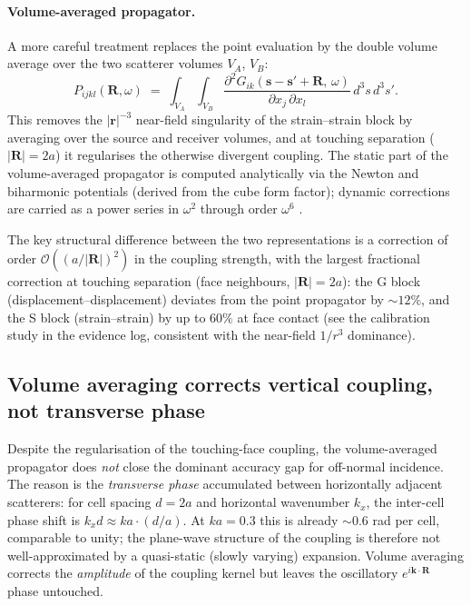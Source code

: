 \documentclass[11pt,a4paper]{article}
\theoremstyle{plain}
\theoremstyle{definition}
\theoremstyle{remark}
\begin{document}
\paragraph{Volume-averaged propagator.}
A more careful treatment replaces the point evaluation by the double
volume average over the two scatterer volumes $V_A$, $V_B$:
\begin{equation}
  P_{ijkl}(\mathbf{R},\omega)
  \;=\;
  \int_{V_A}\!\int_{V_B}
  \frac{\partial^2 G_{ik}(\mathbf{s} - \mathbf{s}' + \mathbf{R},\,\omega)}%
       {\partial x_j\,\partial x_l}
  \,d^3s\,d^3s'.
  \label{eq:va-prop}
\end{equation}
This removes the $|\mathbf{r}|^{-3}$ near-field singularity of the
strain--strain block by averaging over the source and receiver volumes,
and at touching separation ($|\mathbf{R}| = 2a$) it regularises the
otherwise divergent coupling.  The static part of the volume-averaged
propagator is computed analytically via the Newton and biharmonic
potentials (derived from the cube form factor); dynamic corrections
are carried as a power series in $\omega^2$ through order $\omega^6$
\cite{mura1987}.

The key structural difference between the two representations is a
correction of order $\mathcal{O}((a/|\mathbf{R}|)^2)$ in the coupling
strength, with the largest fractional correction at touching separation
(face neighbours, $|\mathbf{R}| = 2a$): the G block (displacement--displacement)
deviates from the point propagator by $\sim\!12\%$, and the S block
(strain--strain) by up to $60\%$ at face contact (see the calibration
study in the evidence log, consistent with the near-field $1/r^3$ dominance).

\subsection{Volume averaging corrects vertical coupling, not transverse phase}
\label{sec:inter-vertical-vs-transverse}

Despite the regularisation of the touching-face coupling, the volume-averaged
propagator does \emph{not} close the dominant accuracy gap for off-normal
incidence.  The reason is the \emph{transverse phase} accumulated between
horizontally adjacent scatterers: for cell spacing $d = 2a$ and horizontal
wavenumber $k_x$, the inter-cell phase shift is $k_x d \approx ka \cdot
(d/a)$.  At $ka = 0.3$ this is already $\sim\!0.6$ rad per cell, comparable
to unity; the plane-wave structure of the coupling is therefore not
well-approximated by a quasi-static (slowly varying) expansion.  Volume
averaging corrects the \emph{amplitude} of the coupling kernel but leaves
the oscillatory $e^{i\mathbf{k}\cdot\mathbf{R}}$ phase untouched.
\end{document}
